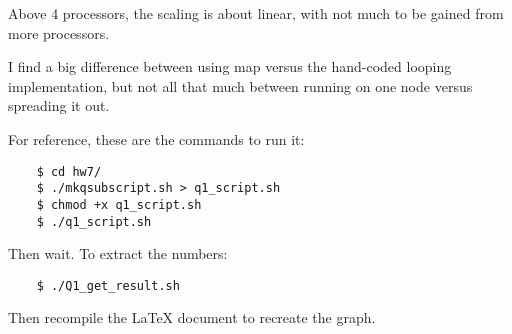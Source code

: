 \documentclass[11pt]{article}
\begin{document}
Above 4 processors, the scaling is about linear, with not much to be gained
from more processors.

I find a big difference between using map versus the hand-coded looping
implementation, but not all that much between running on one node versus
spreading it out.

For reference, these are the commands to run it:
\begin{center}
\begin{verbatim}
    $ cd hw7/
    $ ./mkqsubscript.sh > q1_script.sh
    $ chmod +x q1_script.sh
    $ ./q1_script.sh
\end{verbatim}
\end{center}
Then wait. To extract the numbers:
\begin{center}
\begin{verbatim}
    $ ./Q1_get_result.sh
\end{verbatim}
\end{center}
Then recompile the \LaTeX{} document  to recreate the graph.
\end{document}
